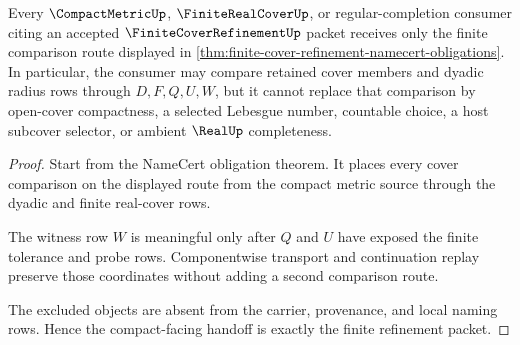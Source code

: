 \begin{theorem}
\label{thm:finite-cover-refinement-compact-handoff}
Every $\CompactMetricUp$, $\FiniteRealCoverUp$, or regular-completion consumer citing an accepted $\FiniteCoverRefinementUp$ packet receives only the finite comparison route displayed in \autoref{thm:finite-cover-refinement-namecert-obligations}. In particular, the consumer may compare retained cover members and dyadic radius rows through $D,F,Q,U,W$, but it cannot replace that comparison by open-cover compactness, a selected Lebesgue number, countable choice, a host subcover selector, or ambient $\RealUp$ completeness.
\end{theorem}
\begin{proof}
Start from the NameCert obligation theorem. It places every cover comparison on the displayed route from the compact metric source through the dyadic and finite real-cover rows.

The witness row $W$ is meaningful only after $Q$ and $U$ have exposed the finite tolerance and probe rows. Componentwise transport and continuation replay preserve those coordinates without adding a second comparison route.

The excluded objects are absent from the carrier, provenance, and local naming rows. Hence the compact-facing handoff is exactly the finite refinement packet.
\end{proof}

\begin{closurestatus}{\FiniteCoverRefinementUp}
  \theoryclosure{\seedClosure}
  \formalstatus{\unformalizedV}
\end{closurestatus}
